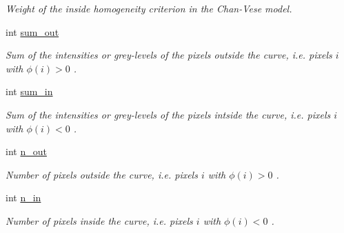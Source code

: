 \begin{DoxyCompactItemize}
\begin{DoxyCompactList}\small\item\em Weight of the inside homogeneity criterion in the Chan-\/\-Vese model. \end{DoxyCompactList}\item 
\hypertarget{classofeli_1_1_a_cwithout_edges_a799b4078bc22cbde48cc29c93727efc5}{int \hyperlink{classofeli_1_1_a_cwithout_edges_a799b4078bc22cbde48cc29c93727efc5}{sum\-\_\-out}}\label{classofeli_1_1_a_cwithout_edges_a799b4078bc22cbde48cc29c93727efc5}

\begin{DoxyCompactList}\small\item\em Sum of the intensities or grey-\/levels of the pixels outside the curve, i.\-e. pixels $i$ with $\phi \left( i\right) >0$ . \end{DoxyCompactList}\item 
\hypertarget{classofeli_1_1_a_cwithout_edges_a14f61eabccbac71bf616674e8feb44f5}{int \hyperlink{classofeli_1_1_a_cwithout_edges_a14f61eabccbac71bf616674e8feb44f5}{sum\-\_\-in}}\label{classofeli_1_1_a_cwithout_edges_a14f61eabccbac71bf616674e8feb44f5}

\begin{DoxyCompactList}\small\item\em Sum of the intensities or grey-\/levels of the pixels intside the curve, i.\-e. pixels $i$ with $\phi \left( i\right) <0$ . \end{DoxyCompactList}\item 
\hypertarget{classofeli_1_1_a_cwithout_edges_a07818e5c3700b0164037e982077de10c}{int \hyperlink{classofeli_1_1_a_cwithout_edges_a07818e5c3700b0164037e982077de10c}{n\-\_\-out}}\label{classofeli_1_1_a_cwithout_edges_a07818e5c3700b0164037e982077de10c}

\begin{DoxyCompactList}\small\item\em Number of pixels outside the curve, i.\-e. pixels $i$ with $\phi \left( i\right) >0$ . \end{DoxyCompactList}\item 
\hypertarget{classofeli_1_1_a_cwithout_edges_a8d2c28710176ae9b562b4001f8171348}{int \hyperlink{classofeli_1_1_a_cwithout_edges_a8d2c28710176ae9b562b4001f8171348}{n\-\_\-in}}\label{classofeli_1_1_a_cwithout_edges_a8d2c28710176ae9b562b4001f8171348}

\begin{DoxyCompactList}\small\item\em Number of pixels inside the curve, i.\-e. pixels $i$ with $\phi \left( i\right) <0$ . \end{DoxyCompactList}\end{DoxyCompactItemize}
